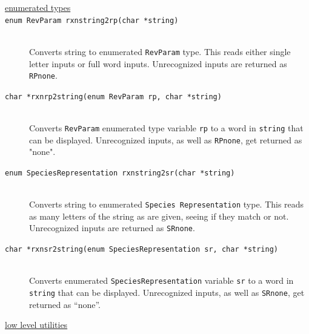 \documentclass {scrbook}
\newcommand {\ttt} {\texttt}
\begin{document}
\begin{description}

\item[\underline{enumerated types}]

\item[\ttt{enum RevParam rxnstring2rp(char *string)}]
\hfill \\
Converts string to enumerated \ttt{RevParam} type. This reads either single letter inputs or full word inputs. Unrecognized inputs are returned as \ttt{RPnone}.

\item[\ttt{char *rxnrp2string(enum RevParam rp, char *string)}]
\hfill \\
Converts \ttt{RevParam} enumerated type variable \ttt{rp} to a word in \ttt{string} that can be displayed. Unrecognized inputs, as well as \ttt{RPnone}, get returned as "none".

\item[\ttt{enum SpeciesRepresentation rxnstring2sr(char *string)}]
\hfill \\
Converts string to enumerated \ttt{Species Representation} type. This reads as many letters of the string as are given, seeing if they match or not. Unrecognized inputs are returned as \ttt{SRnone}.

\item[\ttt{char *rxnsr2string(enum SpeciesRepresentation sr, char *string)}]
\hfill \\
Converts enumerated \ttt{SpeciesRepresentation} variable \ttt{sr} to a word in \ttt{string} that can be displayed. Unrecognized inputs, as well as \ttt{SRnone}, get returned as ``none''.

\item[\underline{low level utilities}]


\end{description}
\end{document}
